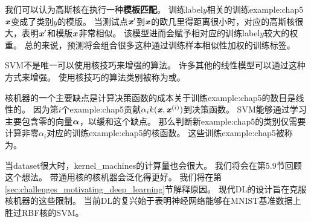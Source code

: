 我们可以认为高斯核在执行一种\textbf{模板匹配}。
训练\gls{label}$y$相关的训练\gls{example:chap5}$\boldsymbol{\mathit{x}}$变成了类别$y$的模版。
当测试点$\boldsymbol{\mathit{x}}'$到$\boldsymbol{\mathit{x}}$的欧几里得距离很小时，对应的高斯核很大，表明$\boldsymbol{\mathit{x}}'$和模版$\boldsymbol{\mathit{x}}$非常相似。
该模型进而会赋予相对应的训练\gls{label}$y$较大的权重。
总的来说，预测将会组合很多这种通过训练样本相似性加权的训练标签。

\gls{SVM}不是唯一可以使用核技巧来增强的算法。
许多其他的线性模型可以通过这种方式来增强。
使用核技巧的算法类别被称为或\citep{Williams+Rasmussen-nips8,Scholkopf99}。    

核机器的一个主要缺点是计算决策函数的成本关于训练\gls{example:chap5}的数目是线性的。
因为第$i$个\gls{example:chap5}贡献$\alpha_i k(\boldsymbol{\mathit{x}}, \boldsymbol{\mathit{x}}^{(i)})$到决策函数。
\gls{SVM}能够通过学习主要包含零的向量$\boldsymbol{\alpha}$，以缓和这个缺点。
那么判断新\gls{example:chap5}的类别仅需要计算非零$\alpha_i$对应的训练\gls{example:chap5}的核函数。
这些训练\gls{example:chap5}被称为。

当\gls{dataset}很大时，\gls{kernel_machines}的计算量也会很大。
我们将会在第5.9节回顾这个想法。
带通用核的核机器会泛化得更好。
我们将在第\ref{sec:challenges_motivating_deep_learning}节解释原因。
现代\gls{DL}的设计旨在克服核机器的这些限制。
当前\gls{DL}的复兴始于\cite{Hinton06-small}表明神经网络能够在MNIST基准数据上胜过RBF核的\gls{SVM}。


